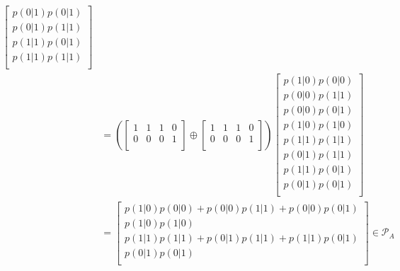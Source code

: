 \documentclass[10pt, a4paper]{article}
\numberwithin{equation}{section} %
\theoremstyle{definition}
\theoremstyle{plain}
\newcommand{\?}{\mathrel{?}} %
\newcommand{\sP}{\mathcal{P}}
\begin{document}
\begin{align}
\begin{bmatrix}
                      p(0|1) p(0|1) \\ p(0|1) p(1|1) \\ p(1|1) p(0|1) \\ p(1|1) p(1|1) \\ 
                    \end{bmatrix} \\
                                                   &=
                                                   \left( \begin{bmatrix}
                                                       1 & 1 & 1 & 0 \\
                                                       0 & 0 & 0 & 1 \\
                                                       \end{bmatrix} \oplus \begin{bmatrix}
                                                       1 & 1 & 1 & 0 \\
                                                       0 & 0 & 0 & 1 \\
                                                   \end{bmatrix} \right)
                                                   \begin{bmatrix} 
                                                     p(1|0) p(0|0) \\ p(0|0) p(1|1) \\ p(0|0) p(0|1) \\ p(1|0) p(1|0) \\
                                                     p(1|1) p(1|1) \\ p(0|1) p(1|1) \\ p(1|1) p(0|1) \\ p(0|1) p(0|1) \\ 
                                                   \end{bmatrix} \\
                                                   &=
                                                   \begin{bmatrix}
                                                     p(1|0) p(0|0) + p(0|0) p(1|1) + p(0|0) p(0|1) \\ p(1|0) p(1|0) \\
                                                     p(1|1) p(1|1) + p(0|1) p(1|1) + p(1|1) p(0|1) \\ p(0|1) p(0|1) \\ 
                                                   \end{bmatrix} \in \sP_A
                  \end{align}
\end{document}
